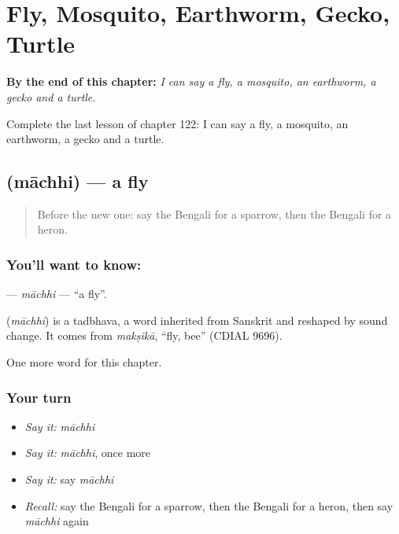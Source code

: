 
\chapter{Fly, Mosquito, Earthworm, Gecko, Turtle}
\label{ch:bn-fly-mosquito-earthworm-gecko-turtle}

\begin{chapteropening}
\textbf{By the end of this chapter:} \emph{I can say a fly, a mosquito, an earthworm, a gecko and a turtle.}

Complete the last lesson of chapter 122: I can say a fly, a mosquito, an earthworm, a gecko and a turtle.
\end{chapteropening}

\section[\texorpdfstring{\bn{মাছি} (māchhi)}{মাছি (māchhi)}]{ (māchhi) — a fly}

\label{lesson:BN-C122-machhi}



\begin{quote}
Before the new one: say the Bengali for a sparrow, then the Bengali for a heron.
\end{quote}

\subsection*{You'll want to know: }
\textbf{} — \emph{māchhi} — \textquotedblleft{}a fly\textquotedblright{}.

\begin{cousinweb}
\textbf{} (\emph{māchhi}) is a tadbhava, a word inherited from Sanskrit and reshaped by sound change. It comes from \emph{makṣikā}, \textquotedblleft{}fly, bee\textquotedblright{} (CDIAL 9696).
\end{cousinweb}

\begin{grammarlens}[title={What you've built}]
One more word for this chapter.
\end{grammarlens}

\subsection*{Your turn}
\begin{itemize}
\raggedright
  \item \emph{Say it:} \emph{māchhi}
  \item \emph{Say it:} \emph{māchhi}, once more
  \item \emph{Say it:} say \emph{māchhi}
  \item \emph{Recall:} say the Bengali for a sparrow, then the Bengali for a heron, then say \emph{māchhi} again
\end{itemize}

